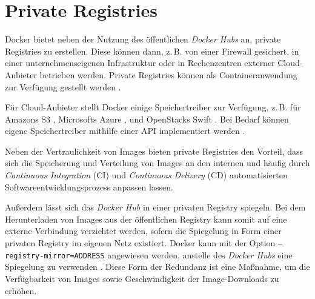 \documentclass[../main.tex]{subfiles}
\begin{document}



  \section{Private Registries}
    Docker bietet neben der Nutzung des öffentlichen \emph{Docker Hubs} an, private Registries zu erstellen. Diese können dann, z.\,B. von einer Firewall gesichert, in einer unternehmenseigenen Infrastruktur oder in Rechenzentren externer Cloud-Anbieter betrieben werden. Private Registries können als Containeranwendung zur Verfügung gestellt werden \cite{dockerRegistry}.

    Für Cloud-Anbieter stellt Docker einige Speichertreiber zur Verfügung, z.\,B. für Amazons S3 \cite{dockerStorageDriverS3}, Microsofts Azure \cite{dockerStorageDriverAzure}, und OpenStacks Swift \cite{dockerStorageDriverSwift}. Bei Bedarf können eigene Speichertreiber mithilfe einer API implementiert werden \cite{dockerStorageDriver}.

    Neben der Vertraulichkeit von Images bieten private Registries den Vorteil, dass sich die Speicherung und Verteilung von Images an den internen und häufig durch \emph{Continuous Integration} (\acrshort{CI}) und \emph{Continuous Delivery} (\acrshort{CD}) automatisierten Softwareentwicklungsprozess anpassen lassen.

    Außerdem lässt sich das \emph{Docker Hub} in einer privaten Registry spiegeln. Bei dem Herunterladen von Images aus der öffentlichen Registry kann somit auf eine externe Verbindung verzichtet werden, sofern die Spiegelung in Form einer privaten Registry im eigenen Netz existiert. Docker kann mit der Option \texttt{--registry-mirror=ADDRESS} angewiesen werden, anstelle des \emph{Docker Hubs} eine Spiegelung zu verwenden \cite{dockerRegistryMirror}. Diese Form der Redundanz ist eine Maßnahme, um die Verfügbarkeit von Images sowie Geschwindigkeit der Image-Downloads zu erhöhen.
\end{document}
